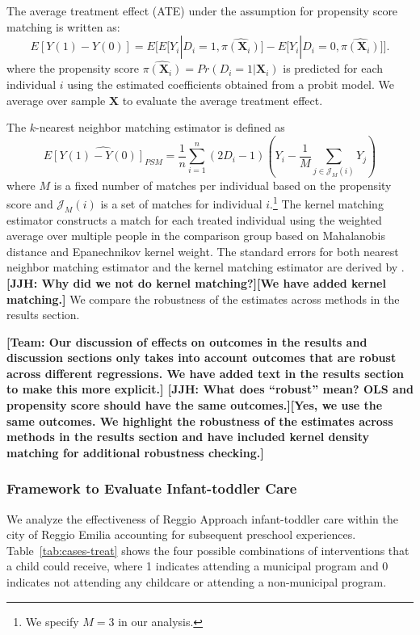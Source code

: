 The average treatment effect (ATE) under the assumption for propensity score matching is written as:
\begin{equation} \label{eq:ATE-PSM}
E[Y(1)-Y(0)] = E\bigg[E\big[Y_i|D_i=1, \hat{\pi(\boldsymbol{X}_i)}\big] - E\big[Y_i|D_i=0, \hat{\pi(\boldsymbol{X}_i)}\big]\bigg].
\end{equation}
where the propensity score $\hat{\pi({\boldsymbol{X}_i})} = Pr(D_i=1|\boldsymbol{X}_i)$ is predicted for each individual $i$ using the estimated coefficients obtained from a probit model. We average over sample $\bm{X}$ to evaluate the average treatment effect.

The $k$-nearest neighbor matching estimator is defined as
\begin{equation} \label{eq:PSM-estimator}
\widehat{E[Y(1)-Y(0)]_{PSM}} = \frac{1}{n} \sum_{i=1}^{n} (2D_i -1)(Y_i - \frac{1}{M}\sum_{j \in \mathcal{J}_M(i)}Y_j )
\end{equation}
where $M$ is a fixed number of matches per individual based on the propensity score and $\mathcal{J}_M(i)$ is a set of matches for individual $i$.\footnote{We specify $M = 3$ in our analysis.} The kernel matching estimator constructs a match for each treated individual using the weighted average over multiple people in the comparison group based on Mahalanobis distance and Epanechnikov kernel weight. The standard errors for both nearest neighbor matching estimator and the kernel matching estimator are derived by \cite{Abadie_Imbens_2006_Econometrica}. \textbf{[JJH: Why did we not do kernel matching?][We have added kernel matching.]} We compare the robustness of the estimates across methods in the results section.

\textbf{[Team: Our discussion of effects on outcomes in the results and discussion sections only takes into account outcomes that are robust across different regressions.  We have added text in the results section to make this more explicit.] [JJH: What does ``robust'' mean? OLS and propensity score should have the same outcomes.][Yes, we use the same outcomes. We highlight the robustness of the estimates across methods in the results section and have included kernel density matching for additional robustness checking.]}

\subsubsection{Framework to Evaluate Infant-toddler Care}
\label{subsubsection:itc}

We analyze the effectiveness of Reggio Approach infant-toddler care within the city of Reggio Emilia accounting for subsequent preschool experiences. Table~\ref{tab:cases-treat} shows the four possible combinations of interventions that a child could receive, where 1 indicates attending a municipal program and 0 indicates not attending any childcare or attending a non-municipal program.

